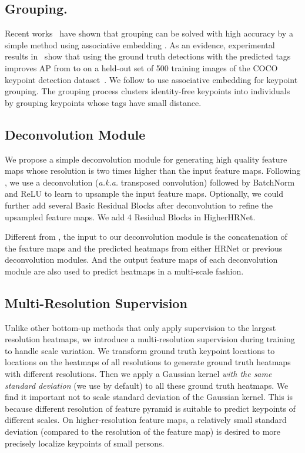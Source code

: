\documentclass[10pt,twocolumn,letterpaper]{article}
\begin{document}
\subsection{Grouping.} Recent works~\cite{newwell2017associative,law2018cornernet} have shown that grouping can be solved with high accuracy by a simple method using associative embedding \cite{newwell2017associative}. As an evidence, experimental results in~\cite{newwell2017associative}  show that using the ground truth detections with the predicted tags improves AP from  to  on a held-out set of 500 training images of the COCO keypoint detection dataset~\cite{lin2014microsoft}. We follow \cite{newwell2017associative} to use associative embedding for keypoint grouping. The grouping process clusters identity-free keypoints into individuals by grouping keypoints whose tags have small  distance.

\subsection{Deconvolution Module}
\label{sec:deconv_modules}
We propose a simple deconvolution module for generating high quality  feature maps whose resolution is two times higher than the input feature maps. Following \cite{xiao2018simple}, we use a  deconvolution (\emph{a.k.a.} transposed convolution) followed by BatchNorm and ReLU to learn to upsample the input feature maps. Optionally, we could further add several Basic Residual Blocks \cite{he2016deep} after deconvolution to refine the upsampled feature maps. We add 4 Residual Blocks in HigherHRNet.

Different from \cite{xiao2018simple}, the input to our deconvolution module is the concatenation of the feature maps and the predicted heatmaps from either HRNet or previous deconvolution modules. And the output feature maps of each deconvolution module are also used to predict heatmaps in a multi-scale fashion.

\subsection{Multi-Resolution Supervision}
\label{sec:mr_supervision}
Unlike other bottom-up methods \cite{newwell2017associative,papandreou2018personlab,cao2017realtime} that only apply supervision to the largest resolution heatmaps, we introduce a multi-resolution supervision during training to handle scale variation. We transform ground truth keypoint locations to locations on the heatmaps of all resolutions to generate ground truth heatmaps with different resolutions. Then we apply a Gaussian kernel \emph{with the same standard deviation} (we use  by default) to all these ground truth heatmaps. We find it important not to scale standard deviation of the Gaussian kernel. This is because different resolution of feature pyramid is suitable to predict keypoints of different scales. On higher-resolution feature maps, a relatively small standard deviation (compared to the resolution of the feature map) is desired to more precisely localize keypoints of small persons. 
\end{document}

